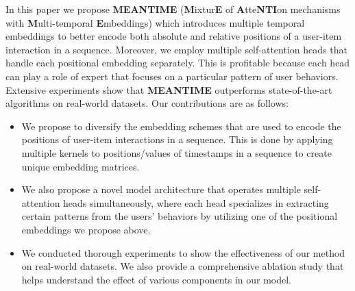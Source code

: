 In this paper we propose \textbf{MEANTIME} (\textbf{M}ixtur\textbf{E} of \textbf{A}tte\textbf{NTI}on mechanisms with \textbf{M}ulti-temporal \textbf{E}mbeddings) which introduces multiple temporal embeddings to better encode both absolute and relative positions of a user-item interaction in a sequence. Moreover, we employ multiple self-attention heads that handle each positional embedding separately. This is profitable because each head can play a role of expert that focuses on a particular pattern of user behaviors. 
Extensive experiments show that \textbf{MEANTIME} outperforms state-of-the-art algorithms on real-world datasets. Our contributions are as follows:
\begin{itemize}
\item We propose to diversify the embedding schemes that are used to encode the positions of user-item interactions in a sequence. This is done by applying multiple kernels to positions/values of timestamps in a sequence to create unique embedding matrices.
\item We also propose a novel model architecture that operates multiple self-attention heads simultaneously, where each head specializes in extracting certain patterns from the users' behaviors by utilizing one of the positional embeddings we propose above.
\item We conducted thorough experiments to show the effectiveness of our method on real-world datasets. We also provide a comprehensive ablation study that helps understand the effect of various components in our model.
\end{itemize}
